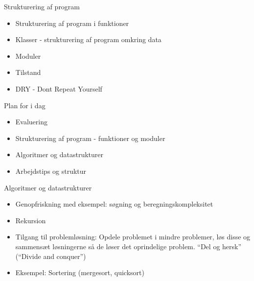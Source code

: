 \documentclass[a4paper,landscape]{slides}
\begin{document}
\begin{slide}
	\begin{center} {\large 
           Strukturering af program
	} \end{center}
	\begin{itemize} \addtolength{\itemsep}{-\baselineskip}
                \item Strukturering af program i funktioner
                \item Klasser - strukturering af program omkring data
                \item Moduler
                \item Tilstand
                \item DRY - Dont Repeat Yourself
	\end{itemize}
\end{slide}

\begin{slide}
	\begin{center} {\large 
            Plan for i dag
	} \end{center}
	\begin{itemize} \addtolength{\itemsep}{-\baselineskip}
            \item Evaluering
            \item Strukturering af program - funktioner og moduler
            \item Algoritmer og datastrukturer
            \item Arbejdstips og struktur
	\end{itemize}
\end{slide}

\begin{slide}
	\begin{center} {\large 
           Algoritmer og datastrukturer
	} \end{center}
	\begin{itemize} \addtolength{\itemsep}{-\baselineskip}
                \item Genopfriskning med eksempel: søgning og beregningskompleksitet
                \item Rekursion
                \item Tilgang til problemløsning: Opdele problemet i mindre problemer, løs disse og sammensæt løsningerne så de løser det oprindelige problem. ``Del og hersk'' (``Divide and conquer'')
                \item Eksempel: Sortering (mergesort, quicksort) 
	\end{itemize}
\end{slide}
\end{document}
